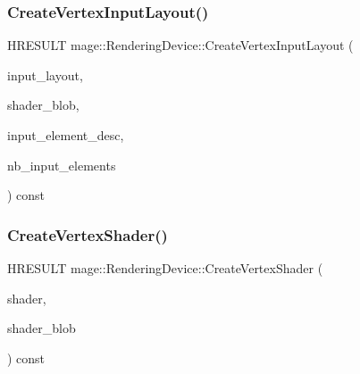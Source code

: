 \hypertarget{classmage_1_1_rendering_device_a4f3918a76c9d8172df6252c37d9bedb4}{}\label{classmage_1_1_rendering_device_a4f3918a76c9d8172df6252c37d9bedb4} 
\subsubsection{\texorpdfstring{Create\+Vertex\+Input\+Layout()}{CreateVertexInputLayout()}}
{\footnotesize\ttfamily H\+R\+E\+S\+U\+LT mage\+::\+Rendering\+Device\+::\+Create\+Vertex\+Input\+Layout (\begin{DoxyParamCaption}\item[{I\+D3\+D11\+Input\+Layout $\ast$$\ast$}]{input\+\_\+layout,  }\item[{\hyperlink{namespacemage_ae74f374780900893caa5555d1031fd79}{Com\+Ptr}$<$ I\+D3\+D\+Blob $>$}]{shader\+\_\+blob,  }\item[{const D3\+D11\+\_\+\+I\+N\+P\+U\+T\+\_\+\+E\+L\+E\+M\+E\+N\+T\+\_\+\+D\+E\+SC $\ast$}]{input\+\_\+element\+\_\+desc,  }\item[{uint32\+\_\+t}]{nb\+\_\+input\+\_\+elements }\end{DoxyParamCaption}) const}

\hypertarget{classmage_1_1_rendering_device_af3825646c575b645b57d12639eaa15ca}{}\label{classmage_1_1_rendering_device_af3825646c575b645b57d12639eaa15ca} 
\subsubsection{\texorpdfstring{Create\+Vertex\+Shader()}{CreateVertexShader()}}
{\footnotesize\ttfamily H\+R\+E\+S\+U\+LT mage\+::\+Rendering\+Device\+::\+Create\+Vertex\+Shader (\begin{DoxyParamCaption}\item[{I\+D3\+D11\+Vertex\+Shader $\ast$$\ast$}]{shader,  }\item[{\hyperlink{namespacemage_ae74f374780900893caa5555d1031fd79}{Com\+Ptr}$<$ I\+D3\+D\+Blob $>$}]{shader\+\_\+blob }\end{DoxyParamCaption}) const}

